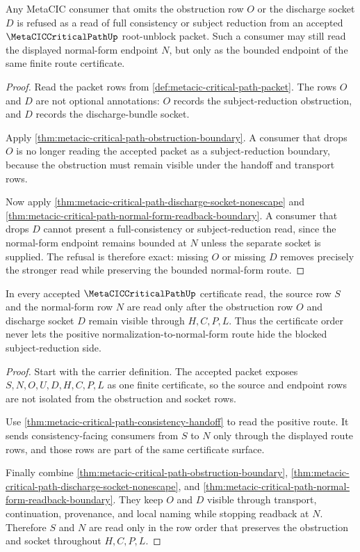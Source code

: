 \begin{theorem}
\label{thm:metacic-critical-path-consumer-refusal-exactness}
Any MetaCIC consumer that omits the obstruction row $O$ or the discharge socket $D$ is refused as a read of full consistency or subject reduction from an accepted $\MetaCICCriticalPathUp$ root-unblock packet. Such a consumer may still read the displayed normal-form endpoint $N$, but only as the bounded endpoint of the same finite route certificate.
\end{theorem}
\begin{proof}
Read the packet rows from \autoref{def:metacic-critical-path-packet}. The rows $O$ and $D$ are not optional annotations: $O$ records the subject-reduction obstruction, and $D$ records the discharge-bundle socket.

Apply \autoref{thm:metacic-critical-path-obstruction-boundary}. A consumer that drops $O$ is no longer reading the accepted packet as a subject-reduction boundary, because the obstruction must remain visible under the handoff and transport rows.

Now apply \autoref{thm:metacic-critical-path-discharge-socket-nonescape} and \autoref{thm:metacic-critical-path-normal-form-readback-boundary}. A consumer that drops $D$ cannot present a full-consistency or subject-reduction read, since the normal-form endpoint remains bounded at $N$ unless the separate socket is supplied. The refusal is therefore exact: missing $O$ or missing $D$ removes precisely the stronger read while preserving the bounded normal-form route.
\end{proof}

\begin{theorem}
\label{thm:metacic-critical-path-certificate-row-order}
In every accepted $\MetaCICCriticalPathUp$ certificate read, the source row $S$ and the normal-form row $N$ are read only after the obstruction row $O$ and discharge socket $D$ remain visible through $H,C,P,L$. Thus the certificate order never lets the positive normalization-to-normal-form route hide the blocked subject-reduction side.
\end{theorem}
\begin{proof}
Start with the carrier definition. The accepted packet exposes $S,N,O,U,D,H,C,P,L$ as one finite certificate, so the source and endpoint rows are not isolated from the obstruction and socket rows.

Use \autoref{thm:metacic-critical-path-consistency-handoff} to read the positive route. It sends consistency-facing consumers from $S$ to $N$ only through the displayed route rows, and those rows are part of the same certificate surface.

Finally combine \autoref{thm:metacic-critical-path-obstruction-boundary}, \autoref{thm:metacic-critical-path-discharge-socket-nonescape}, and \autoref{thm:metacic-critical-path-normal-form-readback-boundary}. They keep $O$ and $D$ visible through transport, continuation, provenance, and local naming while stopping readback at $N$. Therefore $S$ and $N$ are read only in the row order that preserves the obstruction and socket throughout $H,C,P,L$.
\end{proof}
